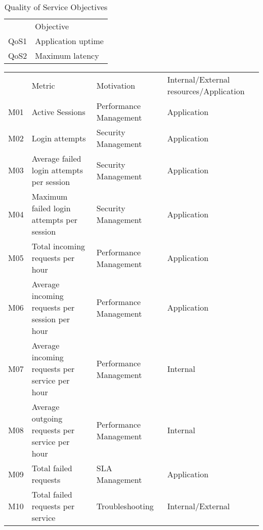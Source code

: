 \begin{table}[]
\begin{tabular}{ll}
     & Objective                                   \\
QoS1 & Application uptime                          \\
QoS2 & Maximum latency                             \\
\end{tabular}
\caption{Quality of Service Objectives}
\label{tab:qos_objectives}
\end{table}

\begin{table}[]
\begin{tabular}{llll}
    & Metric                                             & Motivation                       & Internal/External resources/Application \\
M01 & Active Sessions                                    & Performance Management           & Application                             \\
M02 & Login attempts                                     & Security Management              & Application                             \\
M03 & Average failed login attempts per session          & Security Management              & Application                             \\
M04 & Maximum failed login attempts per session          & Security Management              & Application                             \\
M05 & Total incoming requests per hour                   & Performance Management           & Application                             \\
M06 & Average incoming requests per session per hour     & Performance Management           & Application                             \\
M07 & Average incoming requests per service per hour     & Performance Management           & Internal                                \\
M08 & Average outgoing requests per service per hour     & Performance Management           & Internal                                \\
M09 & Total failed requests                              & SLA Management                   & Application                             \\
M10 & Total failed requests per service                  & Troubleshooting                  & Internal/External                       \\

\end{tabular}
\end{table}
